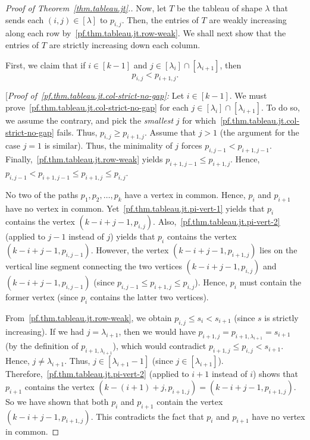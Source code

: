 \documentclass[reqno]{amsart}
\newcommand{\0}{\phantom{c}}
\newcommand{\diag}[1]{\left[#1\right]} %
\newcommand{\tup}[1]{\left( #1 \right)}
\newcommand{\ive}[1]{\left[ #1 \right]}
\theoremstyle{plain}
\theoremstyle{definition}
\numberwithin{equation}{section}
\begin{document}
\begin{proof}[Proof of Theorem~\ref{thm.tableau.jt}.]
Now, let $T$ be the tableau of shape $\lambda$ that sends each $(i,j) \in \diag{\lambda}$  to $p_{i,j}$.
Then, the entries of $T$ are weakly increasing along each row by~\eqref{pf.thm.tableau.jt.row-weak}.
We shall next show that the entries of $T$ are strictly increasing down each column.

First, we claim that if $i \in \ive{k-1}$ and $j \in \ive{\lambda_i} \cap \ive{\lambda_{i+1}}$, then
\begin{equation}
\label{pf.thm.tableau.jt.col-strict-no-gap}
p_{i,j} < p_{i+1,j}.
\end{equation}

[\textit{Proof of~\eqref{pf.thm.tableau.jt.col-strict-no-gap}:}
Let $i \in \ive{k-1}$.
We must prove~\eqref{pf.thm.tableau.jt.col-strict-no-gap} for each $j \in \ive{\lambda_i}  \cap \ive{\lambda_{i+1}}  $.
To do so, we assume the contrary, and pick the \emph{smallest} $j$ for which~\eqref{pf.thm.tableau.jt.col-strict-no-gap} fails.
Thus, $p_{i,j} \geq p_{i+1,j}$.
Assume that $j > 1$ (the argument for the case $j=1$ is similar).
Thus, the minimality of $j$ forces $p_{i,j-1} < p_{i+1,j-1}$.
Finally,~\eqref{pf.thm.tableau.jt.row-weak} yields $p_{i+1,j-1}\leq p_{i+1,j}$.
Hence, $p_{i,j-1}<p_{i+1,j-1}\leq p_{i+1,j}\leq p_{i,j}$.

No two of the paths $p_1,p_2,\ldots,p_k$ have a vertex in common.
Hence, $p_i$ and $p_{i+1}$ have no vertex in common.
Yet~\eqref{pf.thm.tableau.jt.pi-vert-1} yields that $p_i$ contains the vertex $\tup{k-i+j-1, p_{i,j}}$.
Also,~\eqref{pf.thm.tableau.jt.pi-vert-2} (applied to $j-1$ instead of $j$) yields that $p_i$ contains the vertex
$\tup{k-i+j-1, p_{i,j-1}}$.
However, the vertex $\tup{k-i+j-1, p_{i+1,j}}$ lies on the vertical line segment connecting the two vertices $\tup{k-i+j-1, p_{i,j}}$ and $\tup{k-i+j-1,p_{i,j-1}}$ (since $p_{i,j-1} \leq p_{i+1,j} \leq p_{i,j}$).
Hence, $p_i$ must contain the former vertex (since $p_i$ contains the latter two vertices).

From~\eqref{pf.thm.tableau.jt.row-weak}, we obtain $p_{i,j}\leq s_i < s_{i+1}$ (since $s$ is strictly increasing).
If we had $j=\lambda_{i+1}$, then we would have $p_{i+1,j}=p_{i+1,\lambda_{i+1}} = s_{i+1}$ (by the definition of
$p_{i+1,\lambda_{i+1}}$), which would contradict $p_{i+1,j}\leq p_{i,j} < s_{i+1}$.
Hence, $j\neq\lambda_{i+1}$. Thus, $j \in \ive{\lambda_{i+1}-1}$ (since $j \in \ive{\lambda_{i+1}}$).
Therefore,~\eqref{pf.thm.tableau.jt.pi-vert-2} (applied to $i+1$ instead of $i$) shows that $p_{i+1}$ contains the vertex $\tup{k-\left(  i+1\right)+j, p_{i+1,j}} = \tup{k-i+j-1, p_{i+1,j}}$.
So we have shown that both $p_i$ and $p_{i+1}$ contain the vertex $\tup{k-i+j-1, p_{i+1,j}}$.
This contradicts the fact that $p_i$ and $p_{i+1}$ have no vertex in common.


\end{proof}
\end{document}
